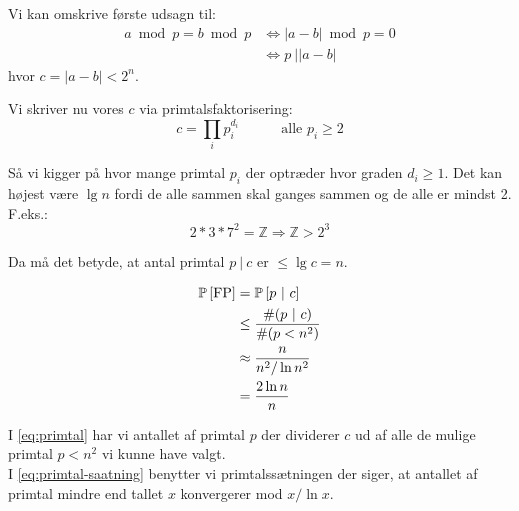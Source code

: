 Vi kan omskrive første udsagn til:
\begin{align}
  a \bmod p = b \bmod p
  &\Longleftrightarrow |a - b| \bmod p = 0\\
  &\Longleftrightarrow p \ \big| |a - b|
\end{align}
hvor $c = |a - b| < 2^n$.


Vi skriver nu vores $c$ via primtalsfaktorisering:
$$
  c = \prod_i p_i^{d_i} \quad\quad\quad \text{alle $p_i \geq 2$}
$$

Så vi kigger på hvor mange primtal $p_i$ der optræder hvor graden $d_i \geq 1$. Det kan højest være $\lg n$ fordi de alle sammen skal ganges sammen og de alle er mindst 2. F.eks.:
$$
  2 * 3 * 7^2 = \mathbb Z \Longrightarrow \mathbb Z > 2^3
$$

Da må det betyde, at antal primtal $p \ | \ c$ er $\leq \lg c = n$.

\begin{align}
  \P{\text{FP}}
  &= \P{ p \ | \ c} \nonumber \\
  &\leq \frac{\# (p \ | \ c)}{\# (p < n^2)} \label{eq:primtal} \\
  &\approx \frac{n}{n^2 / \ln n^2} \label{eq:primtal-saatning} \\
  &= \frac{2 \ln n}{n} \nonumber
\end{align}

I \cref{eq:primtal} har vi antallet af primtal $p$ der dividerer $c$ ud af alle de mulige primtal $p < n^2$  vi kunne have valgt.\\
I \cref{eq:primtal-saatning} benytter vi primtalssætningen der siger, at antallet af primtal mindre end tallet $x$ konvergerer mod $x / \ln x$.



